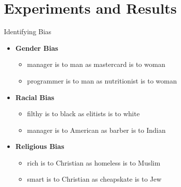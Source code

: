 \documentclass{beamer}
\begin{document}
	\section{Experiments and Results}
	\begin{frame}{Identifying Bias}
		\begin{itemize}
			\item \textbf{Gender Bias}
			\begin{itemize}
				\item manager is to man as mastercard is to woman
				\item programmer is to man as nutritionist is to woman
			\end{itemize}
			\item \textbf{Racial Bias}
			\begin{itemize}
				\item filthy is to black as elitists is to white
				\item manager is to American as barber is to Indian
			\end{itemize}
			\item \textbf{Religious Bias}
			\begin{itemize}
				\item rich is to Christian as homeless is to Muslim
				\item smart is to Christian as cheapskate is to Jew
			\end{itemize}
		\end{itemize}
	\end{frame}
	
\end{document}
